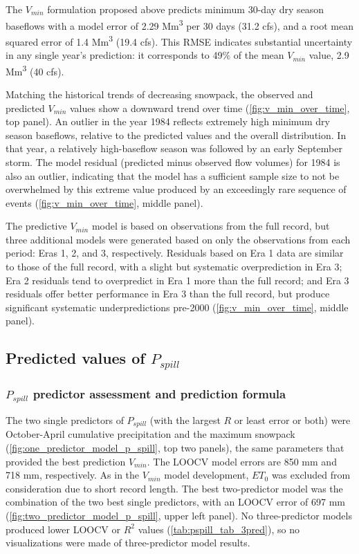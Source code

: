 \documentclass[hess, manuscript]{copernicus}
\begin{document}
The \(V_{min}\) formulation proposed above predicts minimum 30-day dry
season baseflows with a model error of 2.29 Mm\textsuperscript{3} per 30
days (31.2 cfs), and a root mean squared error of 1.4
Mm\textsuperscript{3} (19.4 cfs). This RMSE indicates substantial
uncertainty in any single year's prediction: it corresponds to 49\% of
the mean \(V_{min}\) value, 2.9 Mm\textsuperscript{3} (40 cfs).

Matching the historical trends of decreasing snowpack, the observed and
predicted \(V_{min}\) values show a downward trend over time
(\autoref{fig:v_min_over_time}, top panel). An outlier in the year 1984
reflects extremely high minimum dry season baseflows, relative to the
predicted values and the overall distribution. In that year, a
relatively high-baseflow season was followed by an early September
storm. The model residual (predicted minus observed flow volumes) for
1984 is also an outlier, indicating that the model has a sufficient
sample size to not be overwhelmed by this extreme value produced by an
exceedingly rare sequence of events (\autoref{fig:v_min_over_time},
middle panel).

The predictive \(V_{min}\) model is based on observations from the full
record, but three additional models were generated based on only the
observations from each period: Eras 1, 2, and 3, respectively. Residuals
based on Era 1 data are similar to those of the full record, with a
slight but systematic overprediction in Era 3; Era 2 residuals tend to
overpredict in Era 1 more than the full record; and Era 3 residuals
offer better performance in Era 3 than the full record, but produce
significant systematic underpredictions pre-2000
(\autoref{fig:v_min_over_time}, middle panel).

\subsection{\texorpdfstring{Predicted values of
\(P_{spill}\)}{Predicted values of P\_\{spill\}}}

\subsubsection{\texorpdfstring{\(P_{spill}\) predictor assessment and
prediction
formula}{P\_\{spill\} predictor assessment and prediction formula}}

The two single predictors of \(P_{spill}\) (with the largest \(R\) or
least error or both) were October-April cumulative precipitation and the
maximum snowpack (\autoref{fig:one_predictor_model_p_spill}, top two
panels), the same parameters that provided the best prediction
\(V_{min}\). The LOOCV model errors are 850 mm and 718 mm, respectively.
As in the \(V_{min}\) model development, \(ET_{0}\) was excluded from
consideration due to short record length. The best two-predictor model
was the combination of the two best single predictors, with an LOOCV
error of 697 mm (\autoref{fig:two_predictor_model_p_spill}, upper left
panel). No three-predictor models produced lower LOOCV or \(R^2\) values
(\autoref{tab:pspill_tab_3pred}), so no visualizations were made of
three-predictor model results.
\end{document}
